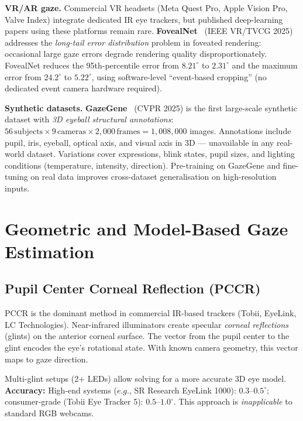 \documentclass[11pt,a4paper]{article}
\begin{document}
\textbf{VR/AR gaze.}
Commercial VR headsets (Meta Quest Pro, Apple Vision Pro, Valve Index) integrate
dedicated IR eye trackers, but published deep-learning papers using these platforms remain rare.
\textbf{FovealNet}~\cite{fovealnet2025} (IEEE VR/TVCG 2025) addresses the
\emph{long-tail error distribution} problem in foveated rendering:
occasional large gaze errors degrade rendering quality disproportionately.
FovealNet reduces the 95th-percentile error from $8.21^\circ$ to $\mathbf{2.31^\circ}$
and the maximum error from $24.2^\circ$ to $5.22^\circ$, using software-level
``event-based cropping'' (no dedicated event camera hardware required).

\textbf{Synthetic datasets.}
\textbf{GazeGene}~\cite{gazegene2025} (CVPR 2025) is the first large-scale synthetic dataset
with \emph{3D eyeball structural annotations}:
$56\,\text{subjects} \times 9\,\text{cameras} \times 2{,}000\,\text{frames} = 1{,}008{,}000$ images.
Annotations include pupil, iris, eyeball, optical axis, and visual axis in 3D ---
unavailable in any real-world dataset.
Variations cover expressions, blink states, pupil sizes, and lighting conditions
(temperature, intensity, direction).
Pre-training on GazeGene and fine-tuning on real data improves
cross-dataset generalisation on high-resolution inputs.

\section{Geometric and Model-Based Gaze Estimation}
\label{sec:geometric}

\subsection{Pupil Center Corneal Reflection (PCCR)}

PCCR is the dominant method in commercial IR-based trackers (Tobii, EyeLink, LC Technologies).
Near-infrared illuminators create specular \textit{corneal reflections} (glints) on the anterior corneal surface.
The vector from the pupil center to the glint encodes the eye's rotational state.
With known camera geometry, this vector maps to gaze direction.

Multi-glint setups (2+ LEDs) allow solving for a more accurate 3D eye model.
\textbf{Accuracy:} High-end systems ($e.g.$, SR Research EyeLink 1000): $0.3$--$0.5^\circ$; consumer-grade (Tobii Eye Tracker 5): $0.5$--$1.0^\circ$.
This approach is \textit{inapplicable} to standard RGB webcams.
\end{document}
